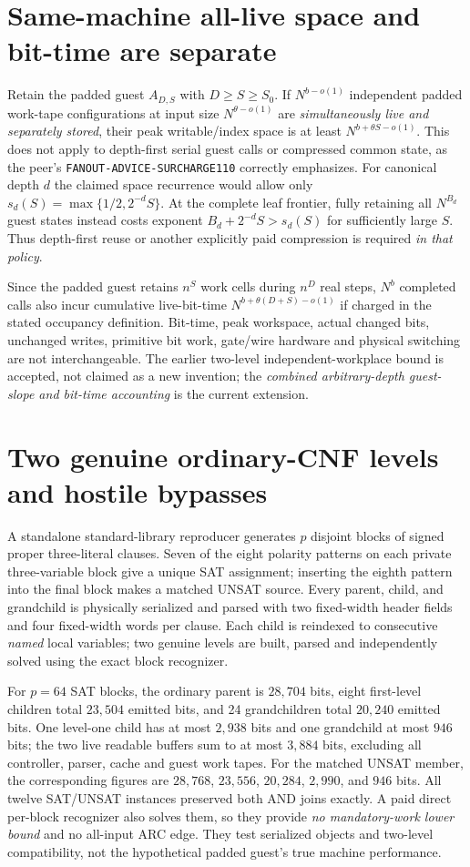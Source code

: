 \documentclass[11pt]{article}
\begin{document}
\section{Same-machine all-live space and bit-time are separate}
Retain the padded guest $A_{D,S}$ with $D\ge S\ge S_0$. If $N^{b-o(1)}$
independent padded work-tape configurations at input size
$N^{\theta-o(1)}$ are \emph{simultaneously live and separately stored},
their peak writable/index space is at least
$N^{b+\theta S-o(1)}$. This does not apply to depth-first serial guest calls
or compressed common state, as the peer's \texttt{FANOUT-ADVICE-SURCHARGE110}
correctly emphasizes. For canonical depth $d$ the claimed space recurrence
would allow only $s_d(S)=\max\{1/2,2^{-d}S\}$. At the complete leaf frontier,
fully retaining all $N^{B_d}$ guest states instead costs exponent
$B_d+2^{-d}S > s_d(S)$ for sufficiently large $S$. Thus depth-first reuse
or another explicitly paid compression is required \emph{in that policy}.

Since the padded guest retains $n^S$ work cells during $n^D$ real steps,
$N^b$ completed calls also incur cumulative live-bit-time
$N^{b+\theta(D+S)-o(1)}$ if charged in the stated occupancy definition.
Bit-time, peak workspace, actual changed bits, unchanged writes, primitive
bit work, gate/wire hardware and physical switching are not interchangeable.
The earlier two-level independent-workplace bound is accepted, not claimed
as a new invention; the \emph{combined arbitrary-depth guest-slope and
bit-time accounting} is the current extension.

\section{Two genuine ordinary-CNF levels and hostile bypasses}
A standalone standard-library reproducer generates $p$ disjoint blocks
of signed proper three-literal clauses. Seven of the eight polarity patterns
on each private three-variable block give a unique SAT assignment; inserting
the eighth pattern into the final block makes a matched UNSAT source. Every
parent, child, and grandchild is physically serialized and parsed with two
fixed-width header fields and four fixed-width words per clause. Each child
is reindexed to consecutive \emph{named} local variables; two genuine levels
are built, parsed and independently solved using the exact block recognizer.

For $p=64$ SAT blocks, the ordinary parent is $28,704$ bits, eight
first-level children total $23,504$ emitted bits, and 24 grandchildren total
$20,240$ emitted bits. One level-one child has at most $2,938$ bits and one
grandchild at most $946$ bits; the two live readable buffers sum to at most
$3,884$ bits, excluding all controller, parser, cache and guest work tapes.
For the matched UNSAT member, the corresponding figures are $28,768$,
$23,556$, $20,284$, $2,990$, and $946$ bits. All twelve SAT/UNSAT instances
preserved both AND joins exactly. A paid direct per-block recognizer also
solves them, so they provide \emph{no mandatory-work lower bound} and no
all-input ARC edge. They test serialized objects and two-level compatibility,
not the hypothetical padded guest's true machine performance.
\end{document}

